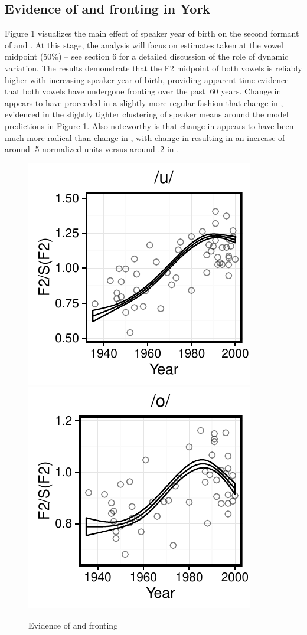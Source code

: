\documentclass[12pt]{article}
\begin{document}
\subsection{Evidence of  and  fronting in York}
Figure 1 visualizes the main effect of speaker year of birth on the second formant of  and . At this stage, the analysis will focus on estimates taken at the vowel midpoint (50\%) -- see section 6 for a detailed discussion of the role of dynamic variation. The results demonstrate that the F2 midpoint of both vowels is reliably higher with increasing speaker year of birth, providing apparent-time evidence that both vowels have undergone fronting over the past $~$60 years. Change in  appears to have proceeded in a slightly more regular fashion that change in , evidenced in the slightly tighter clustering of speaker means around the model predictions in Figure 1.  Also noteworthy is that change in  appears to have been much more radical than change in , with change in  resulting in an increase of around .5 normalized units versus around .2 in . 
\begin{figure}[!htbp]
\centering
\includegraphics{uwchange}
\includegraphics{owchange}
\caption{Evidence of  and  fronting}
\end{figure}
\end{document}
